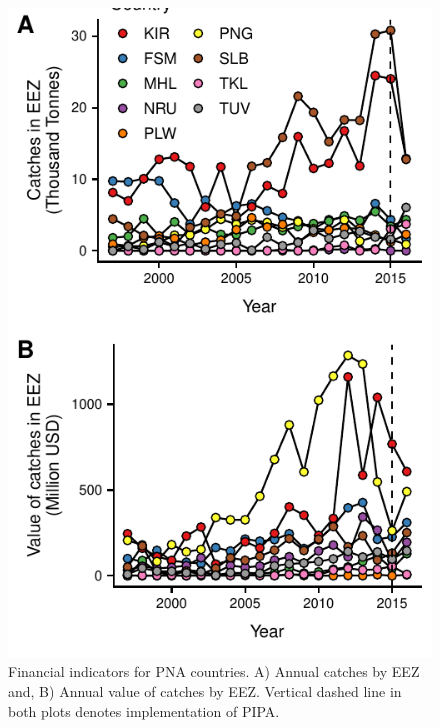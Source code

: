 \documentclass[9p,twocolumn,twoside,lineno]{pnas-new}
\begin{document}
\begin{figure}
\centering
	\includegraphics{img/catches.pdf}
	\caption{\label{fig:catches}Financial indicators for PNA countries. A) Annual catches by EEZ and, B) Annual value of catches by EEZ. Vertical dashed line in both plots denotes implementation of PIPA.}
\end{figure}

\clearpage
\end{document}
